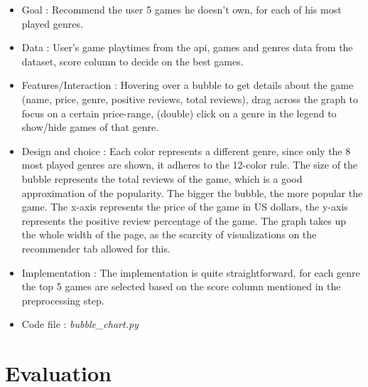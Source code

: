 \documentclass{article}
\begin{document}
	\begin{itemize}
		\item Goal : Recommend the user 5 games he doesn't own, for each of his most played genres.
		\item Data : User's game playtimes from the api, games and genres data from the dataset, score column to decide on the best games.
		\item Features/Interaction : Hovering over a bubble to get details about the game (name, price, genre, positive reviews, total reviews), drag across the graph to focus on a certain price-range, (double) click on a genre in the legend to show/hide games of that genre. 
		\item Design and choice : Each color represents a different genre, since only the 8 most played genres are shown, it adheres to the 12-color rule. The size of the bubble represents the total reviews of the game, which is a good approximation of the popularity. The bigger the bubble, the more popular the game. The x-axis represents the price of the game in US dollars, the y-axis represents the positive review percentage of the game. The graph takes up the whole width of the page, as the scarcity of visualizations on the recommender tab allowed for this.
		\item Implementation : The implementation is quite straightforward, for each genre the top 5 games are selected based on the score column mentioned in the preprocessing step.
		\item Code file : \textit{bubble\_chart.py}
	\end{itemize}
	
	\newpage

	\section{Evaluation}
	
\end{document}
